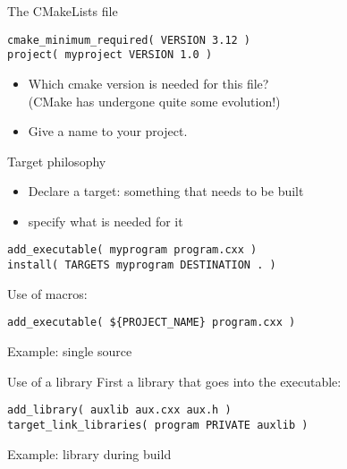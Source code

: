 \lstset{language=CMake}

\begin{numberedframe}{The CMakeLists file}
\begin{lstlisting}
cmake_minimum_required( VERSION 3.12 )
project( myproject VERSION 1.0 )
\end{lstlisting}
  \begin{itemize}
  \item Which cmake version is needed for this file?\\
    (CMake has undergone quite some evolution!)
  \item Give a name to your project.
  \end{itemize}
\end{numberedframe}

\begin{numberedframe}{Target philosophy}
  \begin{itemize}
  \item Declare a target: something that needs to be built
  \item specify what is needed for it
  \end{itemize}
\begin{lstlisting}
add_executable( myprogram program.cxx )
install( TARGETS myprogram DESTINATION . )
\end{lstlisting}
Use of macros:
\begin{lstlisting}
add_executable( ${PROJECT_NAME} program.cxx )
\end{lstlisting}
\end{numberedframe}

\begin{numberedframe}{Example: single source}
  
\end{numberedframe}

\begin{numberedframe}{Use of a library}
First a library that goes into the executable:
\begin{lstlisting}
add_library( auxlib aux.cxx aux.h )
target_link_libraries( program PRIVATE auxlib )
\end{lstlisting}
\end{numberedframe}

\begin{numberedframe}{Example: library during build}
  \lstset{numbers=left,numberstyle=\tiny}
    
\end{numberedframe}

